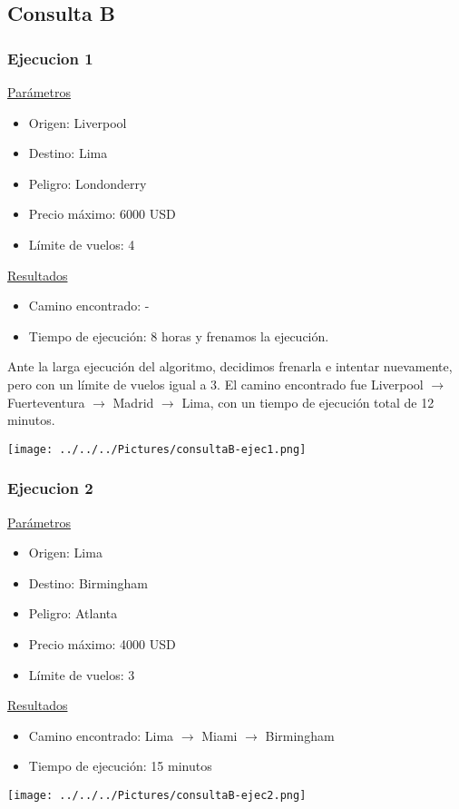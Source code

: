 \documentclass[a4paper,11pt]{article}
\begin{document}
\subsection*{Consulta B}
\subsubsection*{Ejecucion 1}
\noindent
\underline{Parámetros}
\begin{itemize}
\item Origen: Liverpool
\item Destino: Lima
\item Peligro: Londonderry
\item Precio máximo: 6000 USD
\item Límite de vuelos: 4
\end{itemize}
\underline{Resultados}
\begin{itemize}
\item Camino encontrado: -
\item Tiempo de ejecución: 8 horas y frenamos la ejecución.
\end{itemize}
Ante la larga ejecución del algoritmo, decidimos frenarla e intentar nuevamente, pero con un límite de vuelos igual a 3.
El camino encontrado fue Liverpool $\rightarrow$ Fuerteventura $\rightarrow$ Madrid $\rightarrow$ Lima, con un tiempo de ejecución total de 12 minutos.\\
\begin{center}
\texttt{[image: ../../../Pictures/consultaB-ejec1.png]}
\end{center}

\subsubsection*{Ejecucion 2}
\noindent
\underline{Parámetros}
\begin{itemize}
\item Origen: Lima
\item Destino: Birmingham
\item Peligro: Atlanta
\item Precio máximo: 4000 USD
\item Límite de vuelos: 3
\end{itemize}
\underline{Resultados}
\begin{itemize}
\item Camino encontrado: Lima $\rightarrow$ Miami $\rightarrow$ Birmingham
\item Tiempo de ejecución: 15 minutos
\end{itemize}
\begin{center}
\texttt{[image: ../../../Pictures/consultaB-ejec2.png]}
\end{center}
\end{document}
